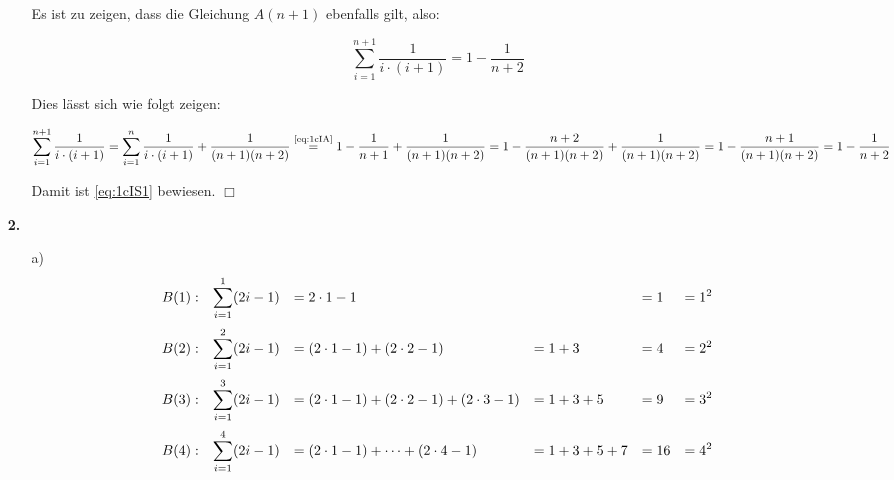 \documentclass[a4paper,10pt]{scrartcl}
\begin{document}
\begin{enumerate}
\begin{enumerate}
                Es ist zu zeigen, dass die Gleichung $A(n + 1)$ ebenfalls gilt, also:

                \begin{equation}\label{eq:1cIS1}
                    \sum_{i=1}^{n + 1} \frac{1}{i \cdot (i + 1)} = 1 - \frac{1}{n + 2}
                \end{equation}

                Dies lässt sich wie folgt zeigen:

                \begin{dmath}
                    \sum_{i=1}^{n + 1} \frac{1}{i \cdot (i + 1)} =
                    \sum_{i=1}^{n} \frac{1}{i \cdot (i + 1)} + \frac{1}{(n + 1)(n + 2)} \overset{\text{\scriptsize\eqref{eq:1cIA}}}{=}
                    1 - \frac{1}{n + 1} + \frac{1}{(n + 1)(n + 2)} =
                    1 - \frac{n + 2}{(n + 1)(n + 2)} + \frac{1}{(n + 1)(n + 2)} =
                    1 - \frac{n + 1}{(n + 1)(n + 2)}=
                    1 - \frac{1}{n + 2}
                \end{dmath}

                Damit ist \eqref{eq:1cIS1} bewiesen. $\Box$
        \end{enumerate}

    \item[\textbf{2.}]
        \begin{enumerate}
            \item[a)]
                $$\begin{array}{l *5{>{\displaystyle}l}}
                    B(1):
                        & \sum_{i=1}^{1} (2i-1)
                        &= 2 \cdot 1 - 1
                        &
                        &= 1
                        &= 1^2\\[1.5em]
                    B(2):
                        & \sum_{i=1}^{2} (2i-1)
                        &= (2 \cdot 1 - 1) + (2 \cdot 2 - 1)
                        &= 1 + 3
                        &= 4
                        &= 2^2\\[1.5em]
                    B(3):
                        & \sum_{i=1}^{3} (2i-1)
                        &= (2 \cdot 1 - 1) + (2 \cdot 2 - 1) + (2 \cdot 3 - 1)
                        &= 1 + 3 + 5
                        &= 9
                        &= 3^2\\[1.5em]
                    B(4):
                        & \sum_{i=1}^{4} (2i-1)
                        &= (2 \cdot 1 - 1) + \dotsb + (2 \cdot 4 - 1)
                        &= 1 + 3 + 5 + 7
                        &= 16
                        &= 4^2\\
                \end{array}$$


\end{enumerate}
\end{enumerate}
\end{document}
